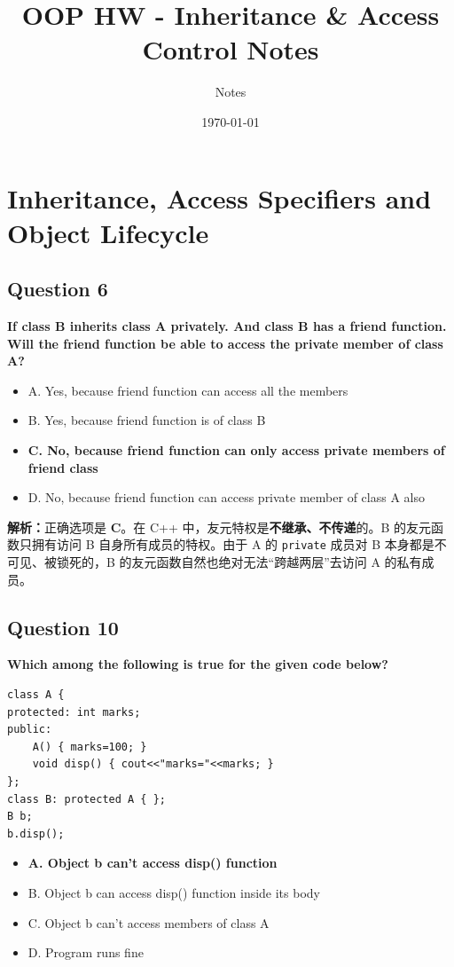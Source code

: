 \documentclass[11pt, a4paper]{article}
\title{OOP HW - Inheritance \& Access Control Notes}
\author{Notes}
\date{\today}
\begin{document}
\maketitle
\section{Inheritance, Access Specifiers and Object Lifecycle}


\subsection*{Question 6}
\textbf{If class B inherits class A privately. And class B has a friend function. Will the friend function be able to access the private member of class A?}
\begin{itemize}
    \item A. Yes, because friend function can access all the members
    \item B. Yes, because friend function is of class B
    \item \textbf{C. No, because friend function can only access private members of friend class}
    \item D. No, because friend function can access private member of class A also
\end{itemize}

\textbf{解析：}正确选项是 \textbf{C}。在 C++ 中，友元特权是\textbf{不继承、不传递}的。B 的友元函数只拥有访问 B 自身所有成员的特权。由于 A 的 \texttt{private} 成员对 B 本身都是不可见、被锁死的，B 的友元函数自然也绝对无法“跨越两层”去访问 A 的私有成员。


\subsection*{Question 10}
\textbf{Which among the following is true for the given code below?}
\begin{lstlisting}
class A {
protected: int marks;
public: 
    A() { marks=100; }
    void disp() { cout<<"marks="<<marks; }
};
class B: protected A { };
B b;
b.disp();
\end{lstlisting}
\begin{itemize}
    \item \textbf{A. Object b can’t access disp() function}
    \item B. Object b can access disp() function inside its body
    \item C. Object b can’t access members of class A
    \item D. Program runs fine
\end{itemize}
\end{document}
